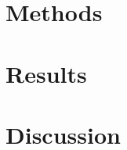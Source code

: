 \documentclass[11pt]{article}
\begin{document}

\section{Methods}


\section{Results}





\section{Discussion}







\end{document}
